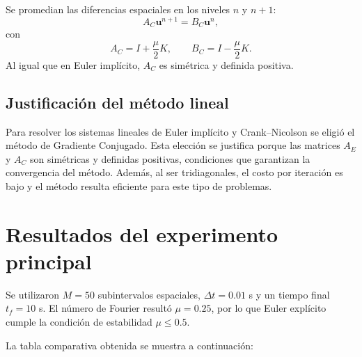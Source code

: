 \documentclass[12pt, letterpaper]{article}
\begin{document}
Se promedian las diferencias espaciales en los niveles \(n\) y \(n+1\):
\[
A_C \mathbf{u}^{n+1} = B_C \mathbf{u}^n,
\]
con
\[
A_C = I+\frac{\mu}{2}K, \qquad B_C = I-\frac{\mu}{2}K.
\]
Al igual que en Euler implícito, \(A_C\) es simétrica y definida positiva.

\subsection{Justificación del método lineal}

Para resolver los sistemas lineales de Euler implícito y Crank--Nicolson se eligió el método de Gradiente Conjugado. Esta elección se justifica porque las matrices \(A_E\) y \(A_C\) son simétricas y definidas positivas, condiciones que garantizan la convergencia del método. Además, al ser tridiagonales, el costo por iteración es bajo y el método resulta eficiente para este tipo de problemas.

\section{Resultados del experimento principal}

Se utilizaron \(M=50\) subintervalos espaciales, \(\Delta t=0.01\) s y un tiempo final \(t_f=10\) s. El número de Fourier resultó \(\mu=0.25\), por lo que Euler explícito cumple la condición de estabilidad \(\mu \le 0.5\).

La tabla comparativa obtenida se muestra a continuación:

\begin{table}[H]
\centering
\caption{Comparación de los esquemas para \(M=50\), \(\Delta t=0.01\) s y \(t_f=10\) s.}
\label{tab:principal}
\end{table}
\end{document}
